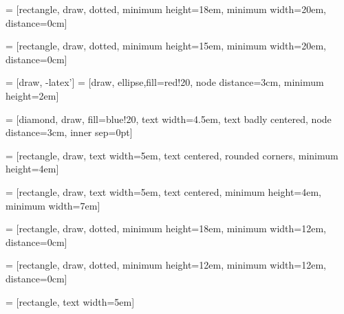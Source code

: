 \documentclass{article}
\begin{document}
 = [rectangle, draw, dotted, minimum height=18em, minimum width=20em, distance=0cm]

 = [rectangle, draw, dotted, minimum height=15em, minimum width=20em, distance=0cm]

 = [draw, -latex']
 = [draw, ellipse,fill=red!20, node distance=3cm,
minimum height=2em]


 = [diamond, draw, fill=blue!20, 
text width=4.5em, text badly centered, node distance=3cm, inner sep=0pt]

 = [rectangle, draw, 
text width=5em, text centered, rounded corners, minimum height=4em]

 = [rectangle, draw, 
text width=5em, text centered, minimum height=4em, minimum width=7em]

 = [rectangle, draw, dotted, minimum height=18em, minimum width=12em, distance=0cm]

 = [rectangle, draw, dotted, minimum height=12em, minimum width=12em, distance=0cm]

 = [rectangle, text width=5em]
\end{document}
